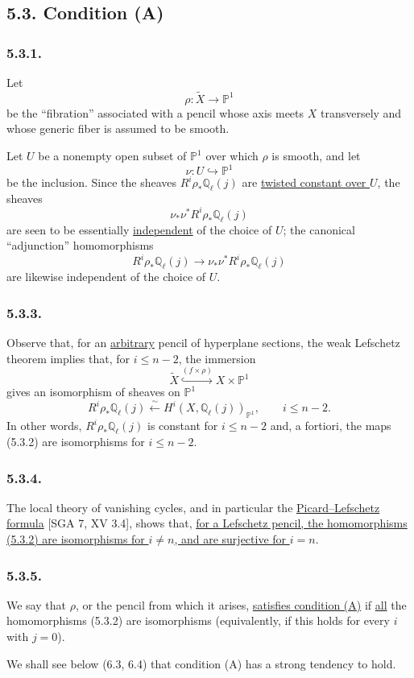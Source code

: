 \subsection*{5.3. Condition (A)}

\subsubsection*{5.3.1.}
Let
\[
\rho:\widetilde X\longrightarrow\mathbb P^1
\]
be the ``fibration'' associated with a pencil whose axis meets $X$
transversely and whose generic fiber is assumed to be smooth.

Let $U$ be a nonempty open subset of $\mathbb P^1$ over which $\rho$ is
smooth, and let
\begin{equation}\tag{5.3.1.1}
\nu:U\hookrightarrow\mathbb P^1
\end{equation}
be the inclusion.  Since the sheaves
$R^i\rho_*\mathbb Q_\ell(j)$ are \underline{twisted constant over $U$}, the
sheaves
\[
\nu_*\nu^*R^i\rho_*\mathbb Q_\ell(j)
\]
are seen to be essentially \underline{independent} of the choice of $U$;
the canonical ``adjunction'' homomorphisms
\begin{equation}\tag{5.3.2}
R^i\rho_*\mathbb Q_\ell(j)
\longrightarrow
\nu_*\nu^*R^i\rho_*\mathbb Q_\ell(j)
\end{equation}
are likewise independent of the choice of $U$.

\subsubsection*{5.3.3.}
Observe that, for an \underline{arbitrary} pencil of hyperplane sections,
the weak Lefschetz theorem implies that, for $i\leq n-2$, the immersion
\[
\widetilde X\overset{(f\times\rho)}{\hookrightarrow}
X\times\mathbb P^1
\]
gives an isomorphism of sheaves on $\mathbb P^1$
\[
R^i\rho_*\mathbb Q_\ell(j)
\xleftarrow{\ \sim\ }
H^i(X,\mathbb Q_\ell(j))_{\mathbb P^1},
\qquad i\leq n-2.
\]
In other words, $R^i\rho_*\mathbb Q_\ell(j)$ is constant for
$i\leq n-2$ and, a fortiori, the maps (5.3.2) are isomorphisms for
$i\leq n-2$.

\subsubsection*{5.3.4.}
The local theory of vanishing cycles, and in particular the
\underline{Picard--Lefschetz formula} [SGA 7, XV 3.4], shows that,
\underline{for a Lefschetz pencil, the homomorphisms (5.3.2) are
isomorphisms for $i\neq n$, and are surjective for $i=n$}.

\subsubsection*{5.3.5.}
We say that $\rho$, or the pencil from which it arises,
\underline{satisfies condition (A)} if \underline{all} the homomorphisms
(5.3.2) are isomorphisms (equivalently, if this holds for every $i$ with
$j=0$).

We shall see below (6.3, 6.4) that condition (A) has a strong tendency to
hold.
